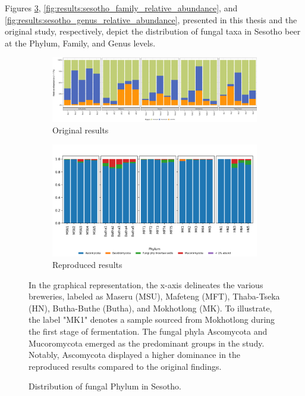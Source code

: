     Figures \ref{fig:results:sesotho_phyla_relative_abundance}, \ref{fig:results:sesotho_family_relative_abundance}, and \ref{fig:results:sesotho_genus_relative_abundance}, presented in this thesis and the original study, respectively, depict the distribution of fungal taxa in Sesotho beer at the Phylum, Family, and Genus levels.

    \begin{figure}[H]
        \centering
        \begin{subfigure}[b]{1\textwidth}
            \centering
            \includegraphics[width=\textwidth]{images/sesotho/original_sesotho_phyla_relative_abundance.png}
            \caption{Original results}
            \label{fig:results:original_sesotho_phyla_relative_abundance}
        \end{subfigure}
        \hfill
        \begin{subfigure}[b]{1\textwidth}
            \centering
            \includegraphics[width=\textwidth]{images/sesotho/sesotho_phyla_relative_abundance.png}
            \caption{Reproduced results}
            \label{fig:results:reproduced_sesotho_phyla_relative_abundance}
        \end{subfigure}
        \caption{Distribution of fungal Phylum in Sesotho.}
        \small In the graphical representation, the x-axis delineates the various breweries, labeled as Maseru (MSU), Mafeteng (MFT), Thaba-Tseka (HN), Butha-Buthe (Butha), and Mokhotlong (MK). To illustrate, the label "MK1" denotes a sample sourced from Mokhotlong during the first stage of fermentation. The fungal phyla Ascomycota and Mucoromycota emerged as the predominant groups in the study. Notably, Ascomycota displayed a higher dominance in the reproduced results compared to the original findings.
        \label{fig:results:sesotho_phyla_relative_abundance}
    \end{figure}
    
